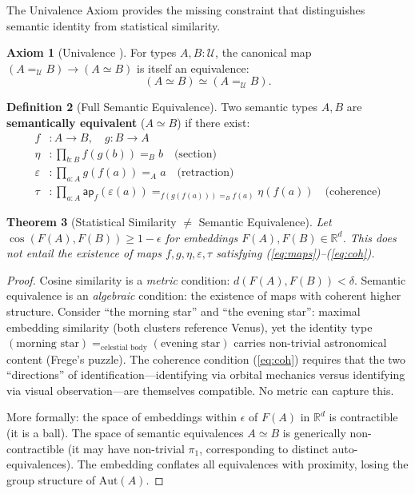 \documentclass[11pt,a4paper]{article}
\theoremstyle{plain}
\newtheorem{theorem}{Theorem}[section]
\theoremstyle{definition}
\newtheorem{definition}[theorem]{Definition}
\newtheorem{axiom}[theorem]{Axiom}
\begin{document}
The Univalence Axiom provides the missing constraint that distinguishes semantic identity from statistical similarity.

\begin{axiom}[Univalence \cite{hottbook}]
For types $A, B : \mathcal{U}$, the canonical map $(A =_{\mathcal{U}} B) \to (A \simeq B)$ is itself an equivalence:
\begin{equation}\label{eq:univalence}
  (A \simeq B) \simeq (A =_{\mathcal{U}} B).
\end{equation}
\end{axiom}

\begin{definition}[Full Semantic Equivalence]\label{def:fullequiv}
Two semantic types $A, B$ are \textbf{semantically equivalent} ($A \simeq B$) if there exist:
\begin{align}
  f &: A \to B, \quad g : B \to A \label{eq:maps} \\
  \eta &: \prod_{b:B} f(g(b)) =_B b \quad \text{(section)} \label{eq:sec} \\
  \varepsilon &: \prod_{a:A} g(f(a)) =_A a \quad \text{(retraction)} \label{eq:ret} \\
  \tau &: \prod_{a:A} \mathsf{ap}_f(\varepsilon(a)) =_{f(g(f(a))) =_B f(a)} \eta(f(a)) \quad \text{(coherence)} \label{eq:coh}
\end{align}
\end{definition}

\begin{theorem}[Statistical Similarity $\neq$ Semantic Equivalence]\label{thm:sim-neq-equiv}
Let $\cos(F(A), F(B)) \geq 1 - \epsilon$ for embeddings $F(A), F(B) \in \mathbb{R}^d$. This does \emph{not} entail the existence of maps $f, g, \eta, \varepsilon, \tau$ satisfying (\ref{eq:maps})--(\ref{eq:coh}).
\end{theorem}

\begin{proof}
Cosine similarity is a \emph{metric} condition: $d(F(A), F(B)) < \delta$. Semantic equivalence is an \emph{algebraic} condition: the existence of maps with coherent higher structure. Consider ``the morning star'' and ``the evening star'': maximal embedding similarity (both clusters reference Venus), yet the identity type $(\text{morning star}) =_{\text{celestial body}} (\text{evening star})$ carries non-trivial astronomical content (Frege's puzzle). The coherence condition (\ref{eq:coh}) requires that the two ``directions'' of identification---identifying via orbital mechanics versus identifying via visual observation---are themselves compatible. No metric can capture this.

More formally: the space of embeddings within $\epsilon$ of $F(A)$ in $\mathbb{R}^d$ is contractible (it is a ball). The space of semantic equivalences $A \simeq B$ is generically non-contractible (it may have non-trivial $\pi_1$, corresponding to distinct auto-equivalences). The embedding conflates all equivalences with proximity, losing the group structure of $\mathrm{Aut}(A)$.
\end{proof}
\end{document}
